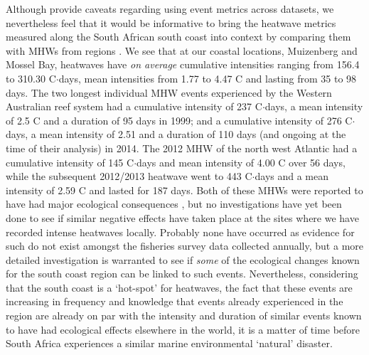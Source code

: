 \documentclass[a4paper,10pt,review]{elsarticle}
\begin{document}
Although \citet{Hobday2016} provide caveats regarding using event metrics across datasets, we nevertheless feel that it would be informative to bring the heatwave metrics measured along the South African south coast into context by comparing them with MHWs from regions \citep[see][]{Hobday2016}. We see that at our coastal locations, Muizenberg and Mossel Bay, heatwaves have \emph{on average} cumulative intensities ranging from 156.4 to 310.30 \degree C$\cdot$days, mean intensities from 1.77 to 4.47 \degree C and lasting from 35 to 98 days. The two longest individual MHW events experienced by the Western Australian reef system \citep{Feng2013} had a cumulative intensity of 237 \degree C$\cdot$days, a mean intensity of 2.5 \degree C and a duration of 95 days in 1999; and a cumulative intensity of 276 \degree C$\cdot$days, a mean intensity of 2.51 and a duration of 110 days (and ongoing at the time of their analysis) in 2014. The 2012 MHW of the north west Atlantic \citep{Mills2012, Chen2014} had a cumulative intensity of 145 \degree C$\cdot$days and mean intensity of 4.00 \degree C over 56 days, while the subsequent 2012/2013 heatwave went to 443 \degree C$\cdot$days and a mean intensity of 2.59 \degree C and lasted for 187 days. Both of these MHWs were reported to have had major ecological consequences \citep{Feng2013, Mills2012, Chen2014}, but no investigations have yet been done to see if similar negative effects have taken place at the sites where we have recorded intense heatwaves locally. Probably none have occurred as evidence for such do not exist amongst the fisheries survey data collected annually, but a more detailed investigation is warranted to see if \emph{some} of the ecological changes known for the south coast region \citep{Bolton2012} can be linked to such events. Nevertheless, considering that the south coast is a `hot-spot' for heatwaves, the fact that these events are increasing in frequency and knowledge that events already experienced in the region are already on par with the intensity and duration of similar events known to have had ecological effects elsewhere in the world, it is a matter of time before South Africa experiences a similar marine environmental `natural' disaster.
\end{document}
